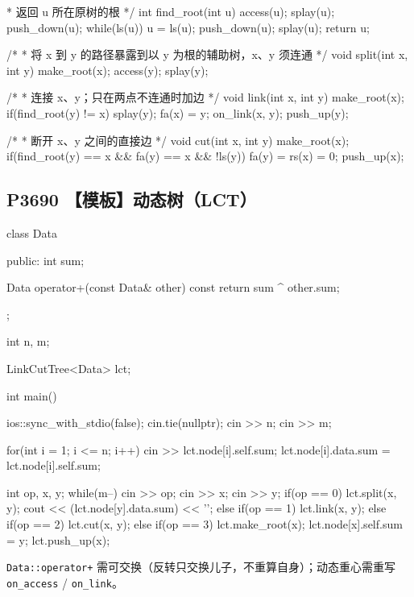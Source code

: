 \vspace{-0.9\baselineskip}
\begin{codeline}[firstnumber=139]
     * 返回 u 所在原树的根
     */
    int find_root(int u) {
        access(u);
        splay(u);
        push_down(u);
        while(ls(u)) {
            u = ls(u);
            push_down(u);
        }
        splay(u);
        return u;
    }

    /*
     * 将 x 到 y 的路径暴露到以 y 为根的辅助树，x、y 须连通
     */
    void split(int x, int y) {
        make_root(x);
        access(y);
        splay(y);
    }

    /*
     * 连接 x、y；只在两点不连通时加边
     */
    void link(int x, int y) {
        make_root(x);
        if(find_root(y) != x) {
            splay(y);
            fa(x) = y;
            on_link(x, y);
            push_up(y);
        }
    }

    /*
     * 断开 x、y 之间的直接边
     */
    void cut(int x, int y) {
        make_root(x);
        if(find_root(y) == x && fa(y) == x && !ls(y)) {
            fa(y) = rs(x) = 0;
            push_up(x);
        }
    }
\end{codeline}
\vspace{-0.9\baselineskip}
\begin{codeline}[firstnumber=185]

#undef ls
#undef rs
#undef fa
#undef data
#undef tag
};
\end{codeline}


\subsection{P3690 【模板】动态树（LCT）}\label{p3690-ux6a21ux677fux52a8ux6001ux6811lct}


\begin{codeline}
class Data {
public:
    int sum;

    Data operator+(const Data& other) const {
        return {sum ^ other.sum};
    }
};

int n, m;

LinkCutTree<Data> lct;

int main() {
    ios::sync_with_stdio(false);
    cin.tie(nullptr);
    cin >> n;
    cin >> m;

    for(int i = 1; i <= n; i++) {
        cin >> lct.node[i].self.sum;
        lct.node[i].data.sum = lct.node[i].self.sum;
    }

    int op, x, y;
    while(m--) {
        cin >> op;
        cin >> x;
        cin >> y;
        if(op == 0) {
            lct.split(x, y);
            cout << (lct.node[y].data.sum) << '\n';
        } else if(op == 1) {
            lct.link(x, y);
        } else if(op == 2) {
            lct.cut(x, y);
        } else if(op == 3) {
            lct.make_root(x);
            lct.node[x].self.sum = y;
            lct.push_up(x);
        }
    }
}
\end{codeline}
\begin{warnbox}
\texttt{Data::operator+} 需可交换（反转只交换儿子，不重算自身）；动态重心需重写 \texttt{on\_access} / \texttt{on\_link}。
\end{warnbox}



